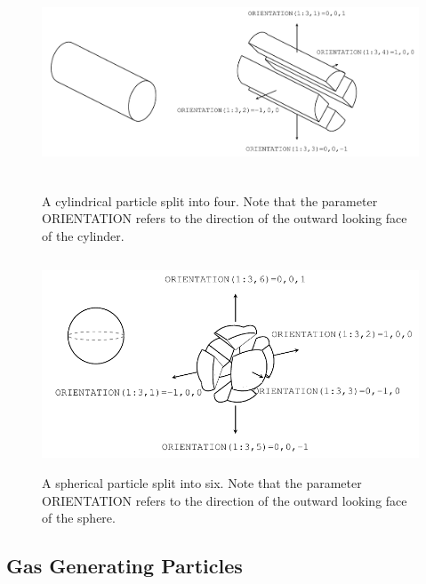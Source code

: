 \documentclass[11pt]{book}
\begin{document}
\begin{figure}[ht]
\begin{center}
\includegraphics[height=2.5in]{FIGURES/FDS_User_Guide_Cylindrical_Particle_Drawing}
\end{center}
\caption[Cylindrical particle split in four directions]{A cylindrical particle split into four. Note that the parameter {\ct ORIENTATION} refers to the direction of the outward looking face of the cylinder.}
\label{cyl_split}
\end{figure}

\begin{figure}[ht]
\begin{center}
\includegraphics[height=2.5in]{FIGURES/FDS_User_Guide_Sphere_Particle_Drawing}
\end{center}
\caption[Spherical particle split in six directions]{A spherical particle split into six. Note that the parameter {\ct ORIENTATION} refers to the direction of the outward looking face of the sphere.}
\label{sphere_split}
\end{figure}

\subsection{Gas Generating Particles}
\label{info:particle_mass_generation}
\end{document}
